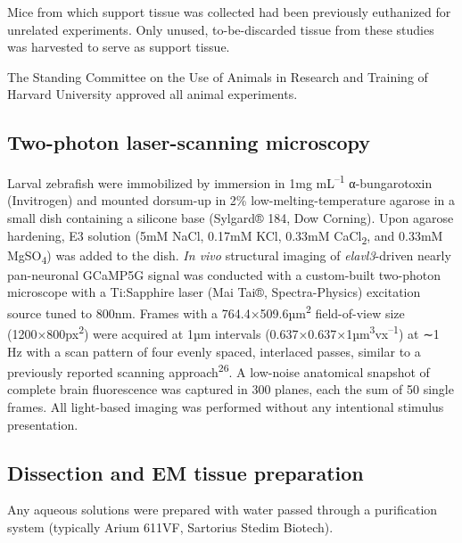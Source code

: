 \documentclass{article}
\begin{document}
Mice from which support tissue was collected had been previously euthanized for unrelated experiments. Only unused, to-be-discarded tissue from these studies was harvested to serve as support tissue.

The Standing Committee on the Use of Animals in Research and Training of Harvard University approved all animal experiments.

\subsection*{Two-photon laser-scanning microscopy}

Larval zebrafish were immobilized by immersion in 1mg mL\textsuperscript{–1} α-bungarotoxin (Invitrogen) and mounted dorsum-up in 2\% low-melting-temperature agarose in a small dish containing a silicone base (Sylgard® 184, Dow Corning). Upon agarose hardening, E3 solution (5mM NaCl, 0.17mM KCl, 0.33mM CaCl\textsubscript{2}, and 0.33mM MgSO\textsubscript{4}) was added to the dish. \textit{In vivo } structural imaging of \textit{elavl3}-driven nearly pan-neuronal GCaMP5G signal was conducted with a custom-built two-photon microscope with a Ti:Sapphire laser (Mai Tai®, Spectra-Physics) excitation source tuned to 800nm. Frames with a 764.4×509.6µm\textsuperscript{2 }field-of-view size (1200×800px\textsuperscript{2}) were acquired at 1µm intervals (0.637×0.637×1µm\textsuperscript{3}vx\textsuperscript{–1}) at ∼1 Hz with a scan pattern of four evenly spaced, interlaced passes, similar to a previously reported scanning approach\textsuperscript{26}. A low-noise anatomical snapshot of complete brain fluorescence was captured in 300 planes, each the sum of 50 single frames. All light-based imaging was performed without any intentional stimulus presentation.

\subsection*{Dissection and EM tissue preparation}

Any aqueous solutions were prepared with water passed through a purification system (typically Arium 611VF, Sartorius Stedim Biotech).
\end{document}
